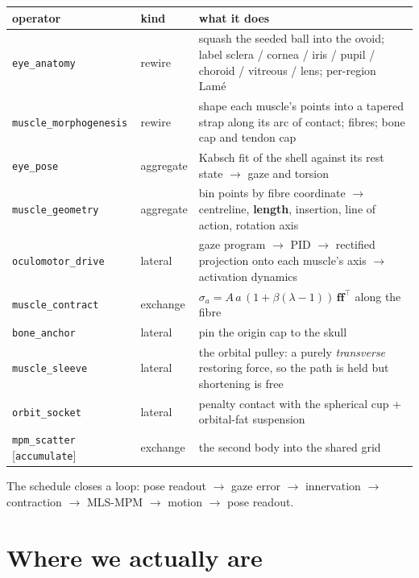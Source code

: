 \documentclass[11pt,a4paper]{article}
\newcommand{\code}[1]{\texttt{#1}}
\begin{document}
\begin{center}\small
\begin{tabular}{@{}llp{8.0cm}@{}}
\toprule
\textbf{operator} & \textbf{kind} & \textbf{what it does} \\
\midrule
\code{eye\_anatomy} & rewire & squash the seeded ball into the ovoid; label sclera / cornea / iris / pupil / choroid / vitreous / lens; per-region Lamé \\
\code{muscle\_morphogenesis} & rewire & shape each muscle's points into a tapered strap along its arc of contact; fibres; bone cap and tendon cap \\
\code{eye\_pose} & aggregate & Kabsch fit of the shell against its rest state $\rightarrow$ gaze and torsion \\
\code{muscle\_geometry} & aggregate & bin points by fibre coordinate $\rightarrow$ centreline, \textbf{length}, insertion, line of action, rotation axis \\
\code{oculomotor\_drive} & lateral & gaze program $\rightarrow$ PID $\rightarrow$ rectified projection onto each muscle's axis $\rightarrow$ activation dynamics \\
\code{muscle\_contract} & exchange & $\sigma_a = A\,a\,(1+\beta(\lambda-1))\,\mathbf{f}\mathbf{f}^{\!\top}$ along the fibre \\
\code{bone\_anchor} & lateral & pin the origin cap to the skull \\
\code{muscle\_sleeve} & lateral & the orbital pulley: a purely \emph{transverse} restoring force, so the path is held but shortening is free \\
\code{orbit\_socket} & lateral & penalty contact with the spherical cup + orbital-fat suspension \\
\code{mpm\_scatter}\,[\code{accumulate}] & exchange & the second body into the shared grid \\
\bottomrule
\end{tabular}
\end{center}

The schedule closes a loop: pose readout $\rightarrow$ gaze error $\rightarrow$ innervation
$\rightarrow$ contraction $\rightarrow$ MLS-MPM $\rightarrow$ motion $\rightarrow$ pose readout.

\section{Where we actually are}
\end{document}
